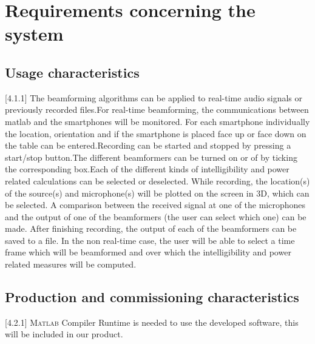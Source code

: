 \documentclass{tudelft-report}
\newcommand{\matlab}{\textsc{Matlab} } %
\begin{document}
\section{Requirements concerning the system}


\subsection{Usage characteristics} %
[4.1.1] The beamforming algorithms can be applied to real-time audio signals or previously recorded files.\newline
[4.1.2] For real-time beamforming, the communications between matlab and the smartphones will be monitored. \newline
[4.1.3] For each smartphone individually the location, orientation and if the smartphone is placed face up or face down on the table can be entered.\newline
[4.1.4] Recording can be started and stopped by pressing a start/stop button.\newline
[4.1.5] The different beamformers can be turned on or of by ticking the corresponding box.\newline
[4.1.6] Each of the different kinds of intelligibility and power related calculations can be selected or deselected. \newline
[4.1.7] While recording, the location(s) of the source(s) and microphone(s) will be plotted on the screen in 3D, which can be selected. \newline
[4.1.8] A comparison between the received signal at one of the microphones and the output of one of the beamformers (the user can select which one) can be made. \newline
[4.1.9] After finishing recording, the output of each of the beamformers can be saved to a file. \newline
[4.1.10] In the non real-time case, the user will be able to select a time frame which will be beamformed and over which the intelligibility and power related measures will be computed.

\subsection{Production and commissioning characteristics}
[4.2.1] \matlab Compiler Runtime is needed to use the developed software, this will be included in our product. 
\end{document}
